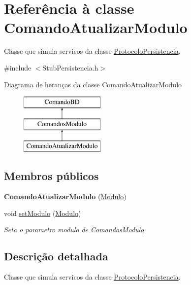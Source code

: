 \hypertarget{class_comando_atualizar_modulo}{
\section{\-Referência à classe \-Comando\-Atualizar\-Modulo}
\label{class_comando_atualizar_modulo}
}


\-Classe que simula servicos da classe \hyperlink{class_protocolo_persistencia}{\-Protocolo\-Persistencia}.  




{\ttfamily \#include $<$\-Stub\-Persistencia.\-h$>$}

\-Diagrama de heranças da classe \-Comando\-Atualizar\-Modulo\begin{figure}[H]
\begin{center}
\leavevmode
\includegraphics[height=3.000000cm]{class_comando_atualizar_modulo}
\end{center}
\end{figure}
\subsection*{\-Membros públicos}
\begin{DoxyCompactItemize}
\item 
\hypertarget{class_comando_atualizar_modulo_a2efff91e3604188e2a76cef1431ea26d}{
{\bfseries \-Comando\-Atualizar\-Modulo} (\hyperlink{class_modulo}{\-Modulo})}
\label{class_comando_atualizar_modulo_a2efff91e3604188e2a76cef1431ea26d}

\item 
void \hyperlink{class_comando_atualizar_modulo_ad10f0b44f67d1d3288ed1153d7f9b83a}{set\-Modulo} (\hyperlink{class_modulo}{\-Modulo})
\begin{DoxyCompactList}\small\item\em \-Seta o parametro modulo de \hyperlink{class_comandos_modulo}{\-Comandos\-Modulo}. \end{DoxyCompactList}\end{DoxyCompactItemize}


\subsection{\-Descrição detalhada}
\-Classe que simula servicos da classe \hyperlink{class_protocolo_persistencia}{\-Protocolo\-Persistencia}. 

